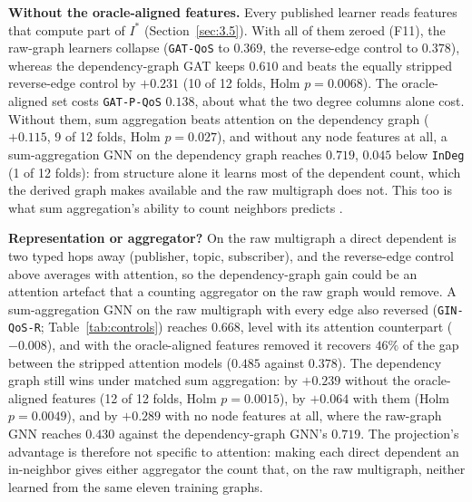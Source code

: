 \noindent\textbf{Without the oracle-aligned features.} Every published learner reads features that compute part of $I^*$ (Section~\ref{sec:3.5}). With all of them zeroed (F11), the raw-graph learners collapse (\texttt{GAT-QoS} to $0.369$, the reverse-edge control to $0.378$), whereas the dependency-graph GAT keeps $0.610$ and beats the equally stripped reverse-edge control by $+0.231$ (10 of 12 folds, Holm $p = 0.0068$). The oracle-aligned set costs \texttt{GAT-P-QoS} $0.138$, about what the two degree columns alone cost. Without them, sum aggregation beats attention on the dependency graph ($+0.115$, 9 of 12 folds, Holm $p = 0.027$), and without any node features at all, a sum-aggregation GNN on the dependency graph reaches $0.719$, $0.045$ below \texttt{InDeg} (1 of 12 folds): from structure alone it learns most of the dependent count, which the derived graph makes available and the raw multigraph does not. This too is what sum aggregation's ability to count neighbors predicts \cite{xu2019gin,chen2020can}.

\noindent\textbf{Representation or aggregator?} On the raw multigraph a direct dependent is two typed hops away (publisher, topic, subscriber), and the reverse-edge control above averages with attention, so the dependency-graph gain could be an attention artefact that a counting aggregator on the raw graph would remove. A sum-aggregation GNN on the raw multigraph with every edge also reversed (\texttt{GIN-QoS-R}; Table~\ref{tab:controls}) reaches $0.668$, level with its attention counterpart ($-0.008$), and with the oracle-aligned features removed it recovers $46\%$ of the gap between the stripped attention models ($0.485$ against $0.378$). The dependency graph still wins under matched sum aggregation: by $+0.239$ without the oracle-aligned features (12 of 12 folds, Holm $p = 0.0015$), by $+0.064$ with them (Holm $p = 0.0049$), and by $+0.289$ with no node features at all, where the raw-graph GNN reaches $0.430$ against the dependency-graph GNN's $0.719$. The projection's advantage is therefore not specific to attention: making each direct dependent an in-neighbor gives either aggregator the count that, on the raw multigraph, neither learned from the same eleven training graphs.

